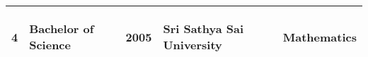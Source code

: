\documentclass[margin]{res}
\begin{document}
\begin{resume}
\begin{center}
\begin{tabular} {|p{1cm} |p{2cm}|p{1cm}|p{3cm}|p{4cm}|  }
            \hline
%
            \begin{center} 4 \end{center} & \begin{center} Bachelor of Science \end{center} & \begin{center} 2005 \end{center} & \begin{center} Sri Sathya Sai University \end{center} & \begin{center} Mathematics \end{center} \\
            \hline

        \end{tabular}
    \end{center}



\end{resume}
\end{document}
